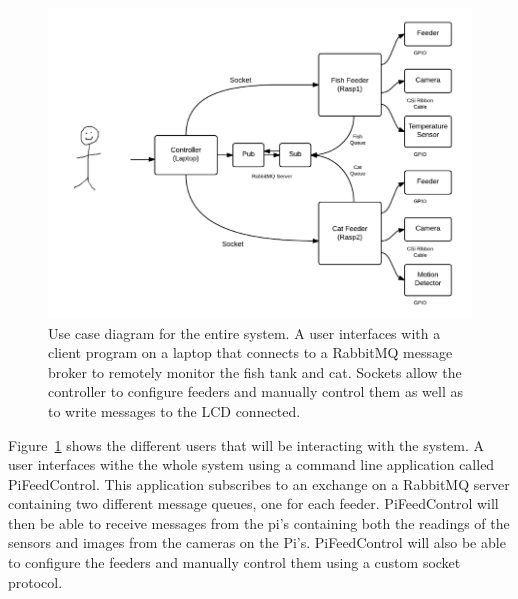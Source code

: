 \begin{figure}[H]
    \centering
    \captionsetup{justification=centering, margin = 0.5cm}
    \includegraphics[scale=0.4]{images/UseCase} 
    \caption{Use case diagram for the entire system. A user interfaces with a
    client program on a laptop that connects to a RabbitMQ message broker to
    remotely monitor the fish tank and cat. Sockets allow the controller to
    configure feeders and manually control them as well as to write messages to
    the LCD connected.}
    \label{fig:UseCase}
\end{figure}

Figure~\ref{fig:UseCase} shows the different users that will be interacting with
the system. A user interfaces withe the whole system using a command line
application called PiFeedControl. This application subscribes to an exchange on
a RabbitMQ server containing two different message queues, one for each feeder.
PiFeedControl will then be able to receive messages from the pi's containing both
the readings of the sensors and images from the cameras on the Pi's. PiFeedControl
will also be able to configure the feeders and manually control them using a
custom socket protocol.

